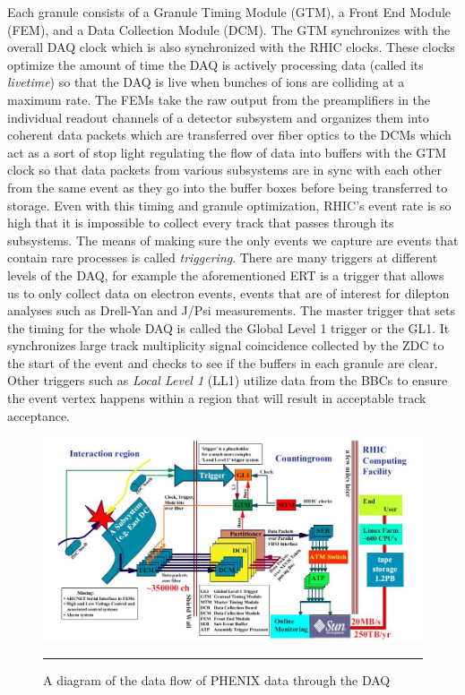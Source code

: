 Each granule consists of a Granule Timing Module (GTM), a Front End Module (FEM), and a Data Collection Module (DCM).  The GTM synchronizes with the overall DAQ clock which is also synchronized with the RHIC clocks. These clocks optimize the amount of time the DAQ is actively processing data (called its \textit{livetime}) so that the DAQ is live when bunches of ions are colliding at a maximum rate. The FEMs take the raw output from the preamplifiers in the individual readout channels of a detector subsystem and organizes them into coherent data packets which are transferred over fiber optics to the DCMs which act as a sort of stop light regulating the flow of data into buffers with the GTM clock so that data packets from various subsystems are in sync with each other from the same event as they go into the buffer boxes before being transferred to storage. Even with this timing and granule optimization, RHIC's event rate is so high that it is impossible to collect every track that passes through its subsystems. The means of making sure the only events we capture are events that contain rare processes is called \textit{triggering}. There are many triggers at different levels of the DAQ, for example the aforementioned ERT is a trigger that allows us to only collect data on electron events, events that are of interest for dilepton analyses such as Drell-Yan and J/Psi measurements. The master trigger that sets the timing for the whole DAQ is called the Global Level 1 trigger or the GL1. It synchronizes large track multiplicity signal coincidence collected by the ZDC to the start of the event and checks to see if the buffers in each granule are clear. Other triggers such as \textit{Local Level 1} (LL1) utilize data from the BBCs to ensure the event vertex happens within a region that will result in acceptable track acceptance.

\begin{figure}[h!]
  \centering
    \includegraphics[width=1\textwidth]{Figures/DAQ.jpg}
    \rule{35em}{0.5pt}
  \caption[A diagram of the data flow of PHENIX data through the DAQ]{A diagram of the data flow of PHENIX data through the DAQ}
  \label{fig:DAQ}
\end{figure}

\pagebreak
\pagebreak
